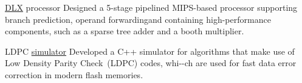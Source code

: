 
\begin{cvskills}

\cvskill
{{\color{myblue}\href{https://en.wikipedia.org/wiki/DLX}{DLX}} processor}
{Designed a 5-stage pipelined MIPS-based processor supporting 
branch prediction, operand forwarding\linebreak and containing high-performance 
components, such as a sparse tree adder and a booth multiplier.}

\cvskill
{LDPC \color{myblue}\href{https://github.com/djah/LDPC_simulator}{simulator}}
{Developed a C++ simulator for algorithms that make use of Low Density Parity 
Check~(LDPC) codes, whi-\linebreak -ch are used for fast data error correction 
in modern flash memories.}

\end{cvskills}